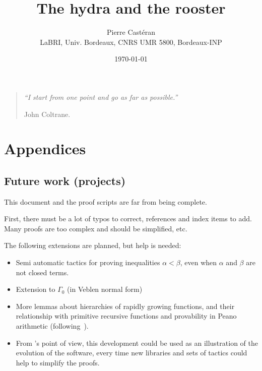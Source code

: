\documentclass{book}
\author{Pierre Castéran\\ LaBRI, Univ. Bordeaux, CNRS UMR 5800, Bordeaux-INP}
\date{\today}
\title{The hydra and the rooster}
\begin{document}
\maketitle




\cleardoublepage




\vspace{10cm}
\begin{quote} 
{ \Large {\it
``I start from one point and go as far as possible.'' } 

John Coltrane.}
\end{quote}

\tableofcontents
 










\chapter{Appendices}




\section{Future work (projects)}
This document and the proof scripts are far from being complete.

First, there must be a lot of typos to correct, references and index items to add. Many proofs are too complex and should be simplified, etc.

The following extensions are planned, but help is needed:

\begin{itemize}
\item Semi automatic tactics for proving inequalities $\alpha < \beta$, even when $\alpha$ and $\beta$ are not closed terms.
\item Extension to $\Gamma_0$ (in Veblen normal form)
\item More lemmas about hierarchies of rapidly growing functions, and their relationship 
    with primitive recursive functions and provability in Peano arithmetic 
(following~\cite{KS81, KP82}).
\item From \coq's point of view, this development could be used as an illustration of the evolution of the software, every time new libraries and sets of tactics could help to simplify the proofs.
\end{itemize}
\end{document}
